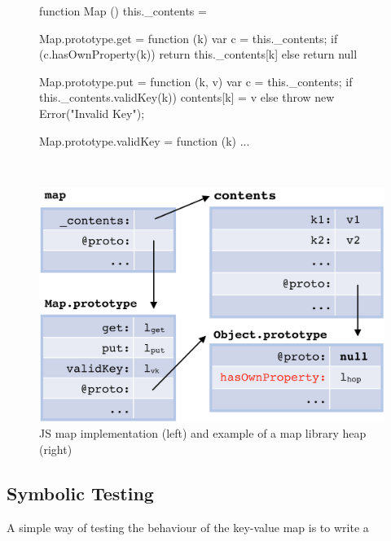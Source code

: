  \begin{figure}[t!]
 \begin{minipage}{0.5\textwidth}
 \begin{lstjs}[firstnumber=1]
function Map () { this._contents = {} }

Map.prototype.get = function (k) {
  var c = this._contents;
  if (c.hasOwnProperty(k)) {
    return this._contents[k] 
  } else { return null }
}

Map.prototype.put = function (k, v) {
  var c = this._contents;
  if this._contents.validKey(k)) {  
    contents[k] = v   
  } else
    throw new Error("Invalid Key");
} 

Map.prototype.validKey = function (k) { ... }
\end{lstjs}
\end{minipage}
\ 
 \begin{minipage}{0.4\textwidth}
 \hspace*{-1.2cm}
 \includegraphics[width=1\textwidth]{figures/mapDiagram.png}
 \end{minipage}
\caption{JS map implementation (left) and example of a map library heap (right) \label{map:example}}
\end{figure}



\subsection{Symbolic Testing}

A simple way of testing the behaviour of the key-value map is to write a 
 
